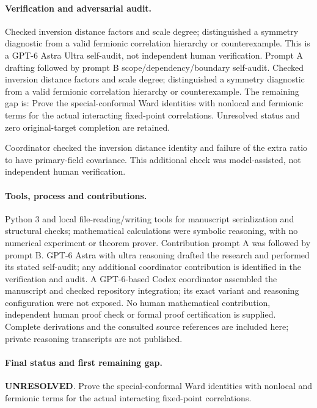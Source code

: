 \documentclass[11pt]{article}
\begin{document}
\paragraph{Verification and adversarial audit.}
Checked inversion distance factors and scale degree; distinguished a symmetry diagnostic from a valid fermionic correlation hierarchy or counterexample. This is a GPT-6 Astra Ultra self-audit, not independent human verification. Prompt A drafting followed by prompt B scope/dependency/boundary self-audit. Checked inversion distance factors and scale degree; distinguished a symmetry diagnostic from a valid fermionic correlation hierarchy or counterexample. The remaining gap is: Prove the special-conformal Ward identities with nonlocal and fermionic terms for the actual interacting fixed-point correlations. Unresolved status and zero original-target completion are retained.

Coordinator checked the inversion distance identity and failure of the extra ratio to have primary-field covariance. This additional check was model-assisted, not independent human verification.

\paragraph{Tools, process and contributions.}
Python 3 and local file-reading/writing tools for manuscript serialization and structural checks; mathematical calculations were symbolic reasoning, with no numerical experiment or theorem prover. Contribution prompt A was followed by prompt B. GPT-6 Astra with ultra reasoning drafted the research and performed its stated self-audit; any additional coordinator contribution is identified in the verification and audit. A GPT-6-based Codex coordinator assembled the manuscript and checked repository integration; its exact variant and reasoning configuration were not exposed. No human mathematical contribution, independent human proof check or formal proof certification is supplied. Complete derivations and the consulted source references are included here; private reasoning transcripts are not published.

\paragraph{Final status and first remaining gap.}
\textbf{UNRESOLVED}. Prove the special-conformal Ward identities with nonlocal and fermionic terms for the actual interacting fixed-point correlations.
\end{document}
